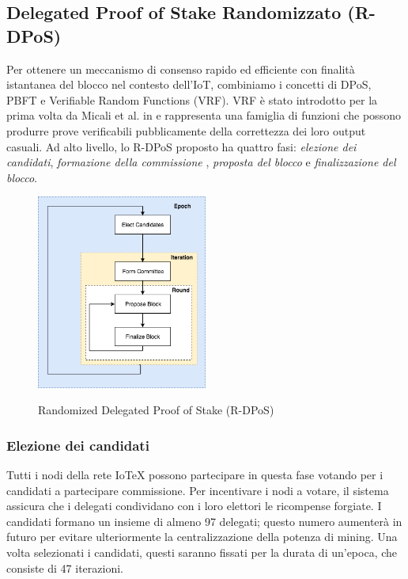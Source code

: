 \subsection{Delegated Proof of Stake Randomizzato (R-DPoS)}
Per ottenere un meccanismo di consenso rapido ed efficiente con finalità istantanea del blocco nel contesto dell'IoT, combiniamo i concetti di DPoS, PBFT e Verifiable Random Functions (VRF). VRF è stato introdotto per la prima volta da Micali et al. in \cite{c19} e rappresenta una famiglia di funzioni che possono produrre prove verificabili pubblicamente della correttezza dei loro output casuali. Ad alto livello, lo R-DPoS proposto ha quattro fasi: \emph{elezione dei candidati}, \emph{formazione della commissione }, \emph{proposta del blocco} e \emph{finalizzazione del blocco}.

\begin{figure}[ht]
	\centering
	\includegraphics[width=0.5\textwidth]{Figura6}
	\label{fig:figure6}
	\caption{Randomized Delegated Proof of Stake (R-DPoS)}
\end{figure}

\subsubsection{Elezione dei candidati}
Tutti i nodi della rete IoTeX possono partecipare in questa fase votando per i candidati a partecipare commissione. Per incentivare i nodi a votare, il sistema assicura che i delegati condividano con i loro elettori le ricompense forgiate. I candidati formano un insieme di almeno 97 delegati; questo numero aumenterà in futuro per evitare ulteriormente la centralizzazione della potenza di mining. Una volta selezionati i candidati, questi saranno fissati per la durata di un'epoca, che consiste di 47 iterazioni.

